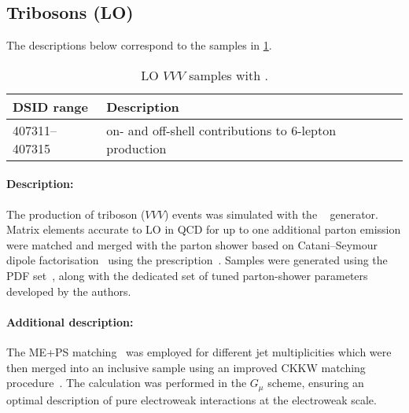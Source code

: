 


\subsection{Tribosons (LO)}

The descriptions below correspond to the samples in
\cref{tab:MB-sherpa-vvvlo}.

\begin{table}[htbp]
  \caption{LO $VVV$ samples with \SHERPA.}%
  \label{tab:MB-sherpa-vvvlo}
  \centering
  \begin{tabular}{l l}
    \toprule
    DSID range & Description \\
    \midrule
    407311--407315   & on- and off-shell contributions to 6-lepton production\\
    \bottomrule
  \end{tabular}
\end{table}

\paragraph{Description:}

The production of triboson ($VVV$) events was simulated with the
\SHERPA[2.2.1]~\cite{Bothmann:2019yzt} generator. Matrix elements accurate to LO in QCD 
for up to one additional parton emission were matched and merged with the \SHERPA parton shower based on Catani--Seymour
dipole factorisation~\cite{Gleisberg:2008fv,Schumann:2007mg} using the \MEPSatLO
prescription~\cite{Hoeche:2011fd,Hoeche:2012yf,Catani:2001cc,Hoeche:2009rj}.
Samples were generated using the \NNPDF[3.0nnlo] PDF set~\cite{Ball:2014uwa},
along with the dedicated set of tuned parton-shower parameters
developed by the \SHERPA authors.

\paragraph{Additional description:}

The ME+PS matching~\cite{Hoeche:2011fd} was employed for different jet
multiplicities which were then merged into an inclusive sample 
using an improved CKKW matching
procedure~\cite{Catani:2001cc,Hoeche:2009rj}.  The calculation was
performed in the $G_\mu$ scheme, ensuring an optimal description
of pure electroweak interactions at the electroweak scale.


